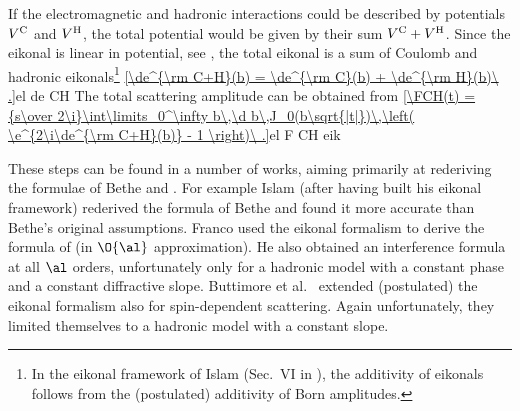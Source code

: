 
If the electromagnetic and hadronic interactions could be described by potentials $V^{\rm C}$ and $V^{\rm H}$, the total potential would be given by their sum $V^{\rm C} + V^{\rm H}$. Since the eikonal is linear in potential, see , the total eikonal is a sum of Coulomb and hadronic eikonals\footnote{%
In the eikonal framework of Islam (Sec.~VI in ), the additivity of eikonals follows from the (postulated) additivity of Born amplitudes.
}
\eqref{\de^{\rm C+H}(b) = \de^{\rm C}(b) + \de^{\rm H}(b)\ .}{el de CH}
The total scattering amplitude can be obtained from 
\eqref{\FCH(t) = {s\over 2\i}\int\limits_0^\infty b\,\d b\,J_0(b\sqrt{|t|})\,\left( \e^{2\i\de^{\rm C+H}(b)} - 1 \right)\ .}{el F CH eik}

These steps can be found in a number of works, aiming primarily at rederiving the formulae of Bethe  and \WY{} .
  For example Islam  (after having built his eikonal framework) rederived the formula of Bethe and found it more accurate than Bethe's original assumptions.
  Franco  used the eikonal formalism to derive the formula of \WY{} (in $\O{\al}$ approximation). He also obtained an interference formula at all $\al$ orders, unfortunately only for a hadronic model with a constant phase and a constant diffractive slope.
  Buttimore et al.~ extended (postulated) the eikonal formalism also for spin-dependent scattering. Again unfortunately, they limited themselves to a hadronic model with a constant slope.

